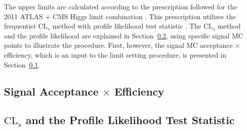 \documentclass[dissertation.tex]{subfiles}
\begin{document}
The upper limits are calculated according to the prescription followed for the 2011 ATLAS + CMS Higgs limit combination \cite{CMS-NOTE-2011/005}.  This prescription utilizes the frequentist $\mbox{CL}_{s}$ method \cite{Read} with profile likelihood test statistic \cite{Cowan_Cranmer_Gross_Vitells}.  The $\mbox{CL}_{s}$ method and the profile likelihood are explained in Section~\ref{sec:CLs and the Profile Likelihood Test Statistic}, using specific signal MC points to illustrate the procedure.  First, however, the signal MC acceptance $\times$ efficiency, which is an input to the limit setting procedure, is presented in Section~\ref{sec:Signal Acceptance Times Efficiency}.

\subsection{Signal Acceptance $\times$ Efficiency}
\label{sec:Signal Acceptance Times Efficiency}


\subsection{$\mbox{CL}_{s}$ and the Profile Likelihood Test Statistic}
\label{sec:CLs and the Profile Likelihood Test Statistic}
\end{document}
